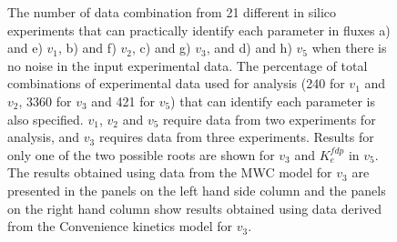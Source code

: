\documentclass[10pt]{article}
\begin{document}
	\begin{figure}[!tbhp]
		\caption{The number of data combination from 21 different in silico experiments that can practically identify each parameter in fluxes a) and e) $v_1$, b)  and f) $v_2$, c) and g) $v_3$, and d) and h) $v_5$ when there is no noise in the input experimental data. The percentage of total combinations of experimental data used for analysis (240 for $v_1$ and $v_2$, 3360 for $v_3$ and 421 for $v_5$) that can identify each parameter is also specified. $v_1$, $v_2$ and $v_5$ require data from two experiments for analysis, and $v_3$ requires data from three experiments. Results for only one of the two possible roots are shown for $v_3$ and $K_e^{fdp}$ in $v_5$. The results obtained using data from the MWC model for $v_3$ are presented in the panels on the left hand side column and the panels on the right hand column show results obtained using data derived from the Convenience kinetics model for $v_3$.}\label{fig:ident}
	\end{figure}
\end{document}
